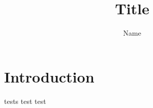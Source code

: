 \documentclass{article}
\title{Title}
\author{Name}
\begin{document}
\maketitle

\section{Introduction}
tests
test
test
\end{document}
